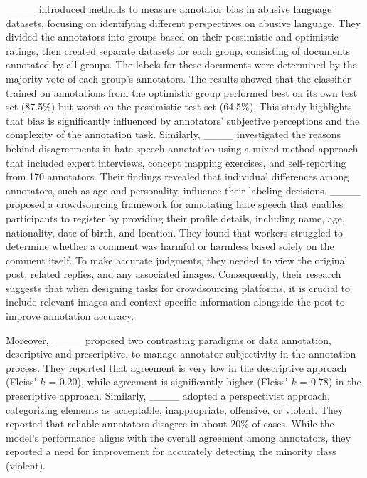 ____ introduced methods to measure annotator bias in abusive language datasets, focusing on identifying different perspectives on abusive language. They divided the annotators into groups based on their pessimistic and optimistic ratings, then created separate datasets for each group, consisting of documents annotated by all groups. The labels for these documents were determined by the majority vote of each group's annotators. The results showed that the classifier trained on annotations from the optimistic group performed best on its own test set (87.5\%) but worst on the pessimistic test set (64.5\%). This study highlights that bias is significantly influenced by annotators' subjective perceptions and the complexity of the annotation task. 
%
Similarly, ____ investigated the reasons behind disagreements in hate speech annotation using a mixed-method approach that included expert interviews, concept mapping exercises, and self-reporting from 170 annotators. Their findings revealed that individual differences among annotators, such as age and personality, influence their labeling decisions.
%
____ proposed a crowdsourcing framework for annotating hate speech that enables participants to register by providing their profile details, including name, age, nationality, date of birth, and location. They found that workers struggled to determine whether a comment was harmful or harmless based solely on the comment itself. To make accurate judgments, they needed to view the original post, related replies, and any associated images. Consequently, their research suggests that when designing tasks for crowdsourcing platforms, it is crucial to include relevant images and context-specific information alongside the post to improve annotation accuracy.
 
Moreover, ____ proposed two contrasting paradigms or data annotation, descriptive and prescriptive, to manage  annotator subjectivity in the annotation process. They reported that agreement is very low in the descriptive approach (Fleiss’ $k$ = 0.20), while agreement is significantly higher (Fleiss’ $k$ = 0.78) in the prescriptive approach.
Similarly, ____ adopted a perspectivist approach, categorizing elements as acceptable, inappropriate, offensive, or violent. They reported that reliable annotators disagree in about 20\% of cases. While the model’s performance aligns with the overall agreement among annotators, they reported a need for improvement for accurately detecting the minority class (violent).

